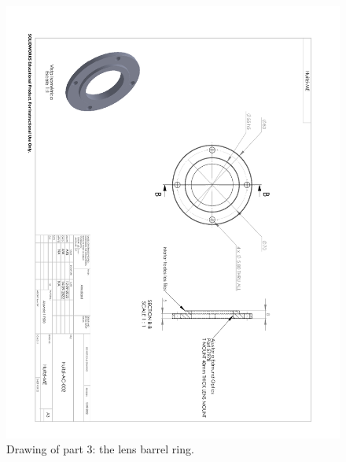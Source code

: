 \begin{figure}
\begin{center}
\includegraphics[angle=180,width=0.9\linewidth]{figures/huitzi-f20-part-3.pdf}
\end{center}
\caption{Drawing of part 3: the lens barrel ring.}
\label{figure:huitzi-f20-part-3}
\end{figure}

